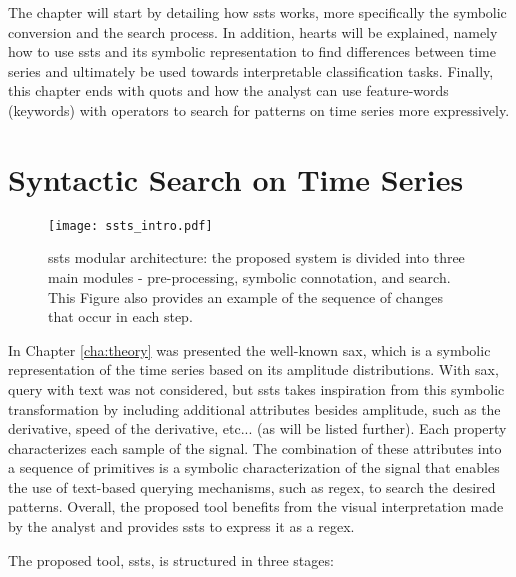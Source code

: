 \par
The chapter will start by detailing how \gls{ssts} works, more specifically the symbolic conversion and the search process. In addition, \gls{hearts} will be explained, namely how to use \gls{ssts} and its symbolic representation to find differences between time series and ultimately be used towards interpretable classification tasks. Finally, this chapter ends with \gls{quots} and how the analyst can use feature-words (keywords) with operators to search for patterns on time series more expressively.







\section{Syntactic Search on Time Series}
\label{sec:ssts}

\begin{figure}
\centering
\texttt{[image: ssts\_intro.pdf]}
\caption{\gls{ssts} modular architecture: the proposed system is divided into three main modules - pre-processing, symbolic connotation, and search. This Figure also provides an example of the sequence of changes that occur in each step.}
\label{fig:ssts_intro}
\end{figure}

In Chapter \ref{cha:theory} was presented the well-known \gls{sax}, which is a symbolic representation of the time series based on its amplitude distributions. With \gls{sax}, query with text was not considered, but \gls{ssts} takes inspiration from this symbolic transformation by including additional attributes besides amplitude, such as the derivative, speed of the derivative, etc... (as will be listed further). Each property characterizes each sample of the signal. The combination of these attributes into a sequence of primitives is a symbolic characterization of the signal that enables the use of text-based querying mechanisms, such as \gls{regex}, to search the desired patterns. Overall, the proposed tool benefits from the visual interpretation made by the analyst and provides \gls{ssts} to express it as a \gls{regex}. 
\par
The proposed tool, \gls{ssts}, is structured in three stages:

